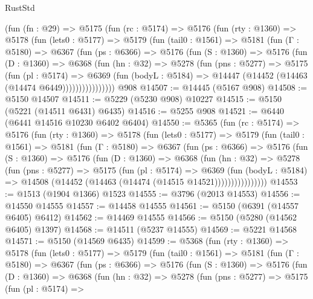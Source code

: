\begin{lexlean}{RustStd}
\begin{coremodule}
    (fun (fn : @29) =>
    @5175
      (fun (rc : @5174) =>
      @5176
        (fun (rty : @1360) =>
        @5178
          (fun (lets0 : @5177) =>
          @5179
            (fun (tail0 : @1561) =>
            @5181
              (fun (Γ : @5180) =>
              @6367
                (fun (ps : @6366) =>
                @5176
                  (fun (S : @1360) =>
                  @5176
                    (fun (D : @1360) =>
                    @6368
                      (fun (hn : @32) =>
                      @5278
                        (fun (pns : @5277) =>
                        @5175
                          (fun (pl : @5174) =>
                          @6369
                            (fun (bodyL : @5184) =>
                            @14447 (@14452 (@14463 (@14474 @6449))))))))))))))))
    @908
@14507 := @14445 (@5167 @908)
@14508 := @5150 @14507
@14511 := @5229 (@5230 @908) @10227
@14515 := @5150 (@5221 (@14511 @6431) @6435)
@14516 := @5255 @908
@14521 := @6440 (@6441 @14516 @10230 @6402 @6404)
@14550 := @5365
    (fun (rc : @5174) =>
    @5176
      (fun (rty : @1360) =>
      @5178
        (fun (lets0 : @5177) =>
        @5179
          (fun (tail0 : @1561) =>
          @5181
            (fun (Γ : @5180) =>
            @6367
              (fun (ps : @6366) =>
              @5176
                (fun (S : @1360) =>
                @5176
                  (fun (D : @1360) =>
                  @6368
                    (fun (hn : @32) =>
                    @5278
                      (fun (pns : @5277) =>
                      @5175
                        (fun (pl : @5174) =>
                        @6369
                          (fun (bodyL : @5184) =>
                          @14508 (@14452 (@14463 (@14474 (@14515 @14521))))))))))))))))
@14553 := @1513 (@1904 @1366) @1523
@14555 := @3796 (@2013 @14553)
@14556 := @14550 @14555
@14557 := @14458 @14555
@14561 := @5150 (@6391 (@14557 @6405) @6412)
@14562 := @14469 @14555
@14566 := @5150 (@5280 (@14562 @6405) @1397)
@14568 := @14511 (@5237 @14555)
@14569 := @5221 @14568
@14571 := @5150 (@14569 @6435)
@14599 := @5368
    (fun (rty : @1360) =>
    @5178
      (fun (lets0 : @5177) =>
      @5179
        (fun (tail0 : @1561) =>
        @5181
          (fun (Γ : @5180) =>
          @6367
            (fun (ps : @6366) =>
            @5176
              (fun (S : @1360) =>
              @5176
                (fun (D : @1360) =>
                @6368
                  (fun (hn : @32) =>
                  @5278
                    (fun (pns : @5277) =>
                    @5175
                      (fun (pl : @5174) =>

\end{coremodule}
\end{lexlean}
